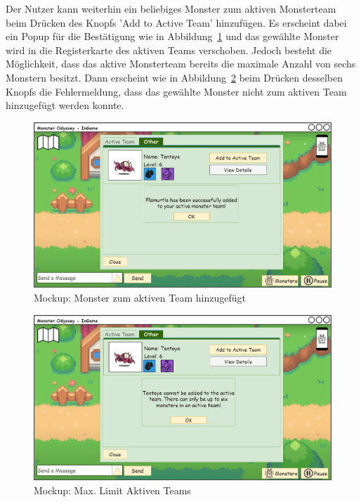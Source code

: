 Der Nutzer kann weiterhin ein beliebiges Monster zum aktiven Monsterteam beim Drücken des Knopfs 'Add to Active Team' hinzufügen. 
Es erscheint dabei ein Popup für die Bestätigung wie in Abbildung~\ref{fig: Monster zum aktiven Team hinzugefügt} und das gewählte Monster wird in die Registerkarte des aktiven Teams verschoben.
Jedoch besteht die Möglichkeit, dass das aktive Monsterteam bereits die maximale Anzahl von sechs Monstern besitzt. 
Dann erscheint wie in Abbildung~\ref{fig: Max. Limit Aktiven Teams} beim Drücken desselben Knopfs die Fehlermeldung, dass das gewählte Monster nicht zum aktiven Team hinzugefügt werden konnte.
\begin{figure}[H]
    \center
    \includegraphics[scale=\scale]{images/mockups/Monster/IngameMonsterMonsterAdded.png}
    \caption{Mockup: Monster zum aktiven Team hinzugefügt}
    \label{fig: Monster zum aktiven Team hinzugefügt}
\end{figure}
\begin{figure}[H]
    \center
    \includegraphics[scale=\scale]{images/mockups/Monster/IngameMonsterMonsterAddedMax.png}
    \caption{Mockup: Max. Limit Aktiven Teams}
    \label{fig: Max. Limit Aktiven Teams}
\end{figure}
